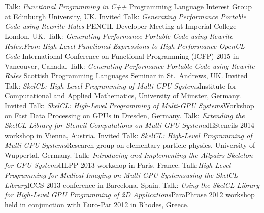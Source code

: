 \documentclass[11pt,a4paper]{moderncv}
\begin{document}
         {Talk: \emph{Functional Programming in C++}\newline
         \small Programming Language Interest Group at Edinburgh University, UK.}
         {Invited Talk: \emph{Generating Performance Portable Code using Rewrite Rules}\newline
         \small PENCIL Developer Meeting at Imperial College London, UK.}
         {Talk: \emph{Generating Performance Portable Code using Rewrite Rules:\newline From High-Level Functional Expressions to High-Performance OpenCL Code}\newline
         \small International Conference on Functional Programming (ICFP) 2015 in Vancouver, Canada.}
         {Talk: \emph{Generating Performance Portable Code using Rewrite Rules}\newline
         \small Scottish Programming Languages Seminar in St.\ Andrews, UK.}
         {Invited Talk: \emph{SkelCL\@: High-Level Programming of Multi-GPU
          Systems}\newline \small Institute for Computational and Applied
          Mathematics, University of Münster, Germany.}
         {Invited Talk: \emph{SkelCL\@: High-Level Programming of Multi-GPU
          Systems}\newline \small Workshop on Fast Data Processing on GPUs in
          Dresden, Germany.}
         {Talk: \emph{Extending the SkelCL Library for Stencil
          Computations on Multi-GPU Systems}\newline \small HiStencils 2014
          workshop in Vienna, Austria.}
         {Invited Talk: \emph{SkelCL\@: High-Level Programming of Multi-GPU
          Systems}\newline \small Research group on elementary particle physics,
          University of Wuppertal, Germany.}
         {Talk: \emph{Introducing and Implementing the Allpairs Skeleton for GPU
          Systems}\newline \small HLPP 2013 workshop in Paris, France.}
         {Talk:\emph{High-Level Programming for Medical Imaging on Multi-GPU
          Systems\newline using the SkelCL Library}\newline \small ICCS 2013 conference in
          Barcelona, Spain.}
       {Talk: \emph{Using the SkelCL Library for High-Level GPU Programming of
        2D Applications}\newline \small ParaPhrase 2012 workshop held in
        conjunction with Euro-Par 2012 in Rhodes, Greece.}
\end{document}
